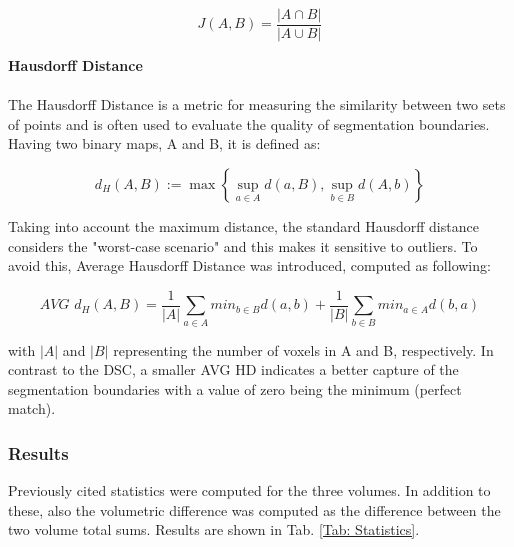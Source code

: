 \documentclass{article}
\begin{document}
	\begin{equation}
	J(A, B) = \frac{|A \cap B|}{|A \cup B|}
	\end{equation}

	
	
	\textbf{Hausdorff Distance}
	\\
	\\
 	The Hausdorff Distance is a metric for measuring the similarity between two sets of points and is often used to evaluate the quality of segmentation boundaries. Having two binary maps, A and B, it is defined as:
 	
 	\begin{equation}
 		d_H(A,B) := \max \left\{ \sup_{a \in A} d(a,B), \sup_{b \in B} d(A,b) \right\}
 	\end{equation}
	

 	Taking into account the maximum distance, the standard Hausdorff distance considers the "worst-case scenario" and this makes it sensitive to outliers.
 	To avoid this, Average Hausdorff Distance was introduced, computed as following:
	
	\begin{equation}
		AVG \, \, d_H(A,B) = \frac{1}{|A|} \sum_{a \in A} min_{b \in B} d(a,b) + \frac{1}{|B|} \sum_{b \in B} min_{a \in A} d(b,a)
	\end{equation}
	
	with $|A|$ and $|B|$ representing the number of voxels in A and B, respectively.
	In contrast to the	DSC, a smaller AVG HD indicates a better capture of the segmentation boundaries with a value of zero being the minimum (perfect match).
	
	
	
	
	
	
	
	
	
	
	\newpage
	\subsubsection{Results}
	Previously cited statistics were computed for the three volumes. In addition to these, also the volumetric difference was computed as the difference between the two volume total sums.
	Results are shown in Tab. \ref{Tab: Statistics}.
	
\end{document}

